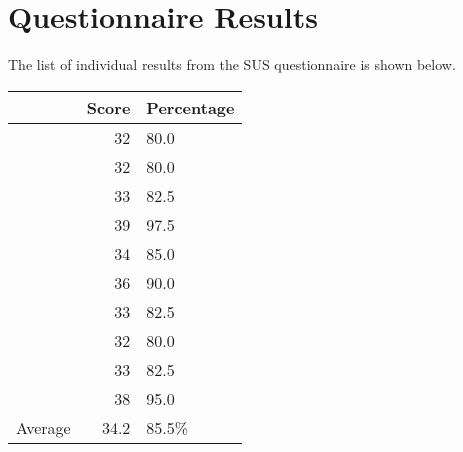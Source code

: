 \section{Questionnaire Results}
\label{app:questionnaire_results}

The list of individual results from the SUS questionnaire is shown below.

\renewcommand{\arraystretch}{1.3}
\begin{longtabu}{rrl}
	\toprule
	& Score & Percentage \\
	\midrule
& 32 & 80.0 \\
& 32 & 80.0 \\
& 33 & 82.5 \\
& 39 & 97.5 \\
& 34 & 85.0 \\
& 36 & 90.0 \\
& 33 & 82.5 \\
& 32 & 80.0 \\
& 33 & 82.5 \\
& 38 & 95.0 \\ \midrule
Average & 34.2 & 85.5\% \\
	\bottomrule
\end{longtabu}
